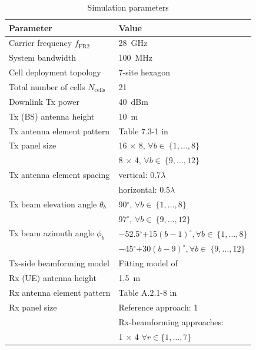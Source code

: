 \documentclass[10pt, conference]{IEEEtran}
\begin{document}
\begin{table}[!t]
\renewcommand{\arraystretch}{1.3}
\caption{Simulation parameters}
\centering
\begin{tabular}{|l | l|}
\hline
\bfseries Parameter & \bfseries Value\\
\hline\hline
Carrier frequency $f_\mathrm{FR2}$ & \SI{28}{GHz}\\
\hline
System bandwidth & \SI{100}{MHz}\\
\hline
Cell deployment topology & 7-site hexagon\\
\hline
Total number of cells $N_\mathrm{cells}$ & 21 \\
\hline
Downlink Tx power & \SI{40}{dBm}\\
\hline
Tx (BS) antenna height & \SI{10}{m}\\
\hline
Tx antenna element pattern & Table 7.3-1 in \cite{b12} \\
\hline
Tx panel size & 16 $\times$ 8, $\forall b \in~\{1,\ldots,8\}$\\
 & 8 $\times$ 4, $\forall b \in~\{9,\ldots,12\}$ \\
 \hline
Tx antenna element spacing & vertical: 0.7$\lambda$\\ 
& horizontal: 0.5$\lambda$\\
\hline
Tx beam elevation angle $\theta_b$ & 90$^{\circ}$, $\forall b \in~\{1,\ldots,8\}$ \\
 & 97$^{\circ}$, $\forall b \in~\{9,\ldots,12\}$\\
 \hline
Tx beam azimuth angle $\phi_b$ & $-$52.5$^{\circ}$$+$15$(b-1)^{\circ}, \forall b \in~\{1,\ldots,8\}$\\
& $-$45$^{\circ}$$+$30$(b-9)^{\circ}, \forall b \in~\{9,\ldots,12\}$\\
\hline
Tx-side beamforming model & Fitting model of \cite{b15}\\
\hline
Rx (UE) antenna height & \SI{1.5}{m}\\
\hline
Rx antenna element pattern & Table A.2.1-8 in \cite{b5}\\ 
\hline
Rx panel size  & Reference approach: 1 
\\ 
 & Rx-beamforming approaches: \\
 & 1 $\times$  4 $\forall r \in \{1,\ldots,7\}$\\

\end{tabular}
\end{table}
\end{document}
